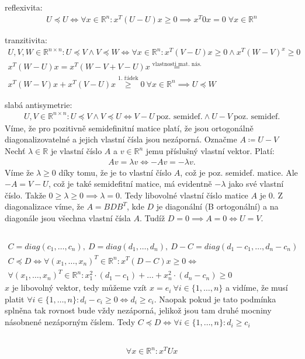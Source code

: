 \documentclass[12pt, a4paper]{article}
\begin{document}
\subsection{}
reflexivita:
\begin{gather*}
U \preceq U \iff \forall x \in \mathbb{R}^n: x^T(U - U)x \geq 0 \implies x^T\mathit{0}x=0  \; \forall x \in \mathbb{R}^n
\end{gather*}

tranzitivita:
\begin{gather*}
U,V,W \in \mathbb{R}^{n \times n}: U \preceq V \land V \preceq W \iff \forall x \in \mathbb{R}^n: x^T(V-U)x \geq 0 \land x^T(W-V)^x \geq 0\\
x^T(W-U)x = x^T(W-V+V-U)x \stackrel{\text{vlastnosti mat. nás.}}{=}\\
x^T(W-V)x + x^T(V-U)x \stackrel{\text{1. řádek}}{\geq} 0\ \forall x \in \mathbb{R}^n \implies U \preceq W
\end{gather*}

slabá antisymetrie:
\begin{gather*}
U,V \in \mathbb{R}^{n \times n}: U \preceq V \land V \preceq U \iff V-U \ \text{poz. semidef.} \land U-V \ \text{poz. semidef.} 
\end{gather*}
Víme, že pro pozitivně semidefinitní matice platí, že jsou ortogonálně diagonalizovatelné a jejich vlastní čísla jsou nezáporná. Označme $A \coloneqq U - V$
Nechť $\lambda \in \mathbb{R}$ je vlastní číslo $A$ a $v \in \mathbb{R}^n$ jemu příslušný vlastní vektor. Platí:
\begin{gather*}
Av=\lambda v \iff -Av = - \lambda v.
\end{gather*}
Víme že $\lambda \geq 0$ díky tomu, že je to vlastní číslo $A$, což je poz. semidef. matice. Ale $-A = V-U$, což je také semidefitní matice, má evidentně $-\lambda$ jako své vlastní číslo. Takže $0 \geq \lambda \geq 0 \implies \lambda = 0$. Tedy libovolné vlastní číslo matice $A$ je 0. Z diagonalizace víme, že $A = BDB^T$, kde $D$ je diagonální (B ortogonální) a na diagonále jsou všechna vlastní čísla $A$. Tudíž $D=0 \implies A=0 \iff U = V$.

\subsection{}
\begin{gather*}
C = diag(c_1,\dots, c_n),\ D = diag(d_1,\dots, d_n),\ D-C=diag(d_1-c_1,\dots, d_n-c_n)\\
C \preceq D \iff \forall (x_1,\dots, x_n)^T \in \mathbb{R}^n: x^T(D-C)x \geq 0 \iff \\
\forall (x_1,\dots, x_n)^T \in \mathbb{R}^n: x_1^2 \cdot (d_1-c_1) + \dots + x_n^2 \cdot (d_n-c_n) \geq 0
\end{gather*}
$x$ je libovolný vektor, tedy můžeme vzít $x = e_i \ \forall i \in \{1,\dots,n\}$ a vidíme, že musí platit $\forall i \in \{1,\dots,n\}: d_i-c_i \geq 0 \iff d_i \geq c_i$. Naopak pokud je tato podmínka splněna tak rovnost bude vždy nezáporná, jelikož jsou tam druhé mocniny násobnené nezáporným číslem. Tedy $C \preceq D \iff \forall i \in \{1,\dots,n\}: d_i \geq c_i$

\subsection{}
\begin{gather*}
\forall x \in \mathbb{R}^n: x^TUx 
\end{gather*}
\end{document}
